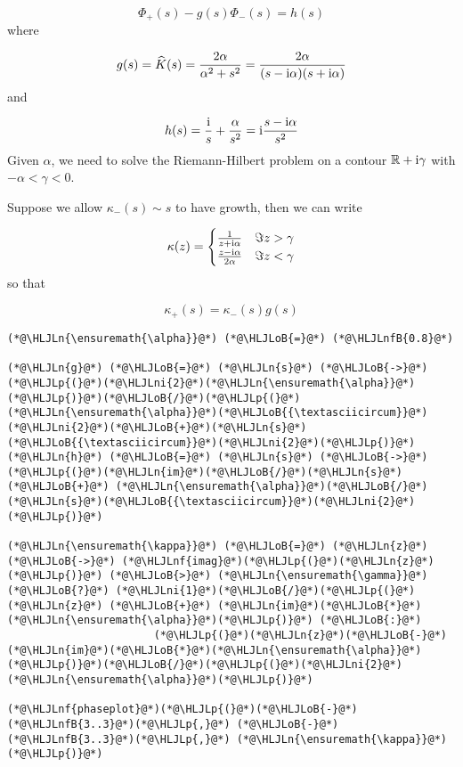 \documentclass[12pt,landscape]{article}
\newcommand{\HLJLn}[1]{#1}
\newcommand{\HLJLnf}[1]{\textcolor[RGB]{66,102,213}{#1}}
\newcommand{\HLJLnfB}[1]{\textcolor[RGB]{59,151,46}{#1}}
\newcommand{\HLJLni}[1]{\textcolor[RGB]{59,151,46}{#1}}
\newcommand{\HLJLoB}[1]{\textcolor[RGB]{102,102,102}{\textbf{#1}}}
\newcommand{\HLJLp}[1]{#1}
\def\I{ {\rm i} }
\begin{document}
{\[
\Phi_+(s) - g(s) \Phi_-(s) = h(s)
\]
where

\[
g(s) = \widehat K(s) = {2\alpha \over \alpha^2 +s^2}= {2 \alpha \over (s-\I \alpha)(s+\I \alpha)}
\]
and

\[
h(s) = {\I \over s} + {\alpha \over s^2} = \I {s -\I \alpha \over s^2}
\]
Given $\alpha$, we need to solve the Riemann-Hilbert problem on a contour $\mathbb{R} + \I\gamma$ with $-\alpha < \gamma < 0$.

Suppose we allow $\kappa_-(s) \sim s$ to have growth, then we can write

\[
\kappa(z) = \begin{cases} {1 \over z+\I \alpha }& \Im z > \gamma \\
                        {z-\I \alpha \over 2 \alpha} & \Im z < \gamma
\end{cases}
\]
so that

\[
\kappa_+(s) = \kappa_-(s) g(s)
\]

\begin{lstlisting}
(*@\HLJLn{\ensuremath{\alpha}}@*) (*@\HLJLoB{=}@*) (*@\HLJLnfB{0.8}@*)

(*@\HLJLn{g}@*) (*@\HLJLoB{=}@*) (*@\HLJLn{s}@*) (*@\HLJLoB{->}@*) (*@\HLJLp{(}@*)(*@\HLJLni{2}@*)(*@\HLJLn{\ensuremath{\alpha}}@*)(*@\HLJLp{)}@*)(*@\HLJLoB{/}@*)(*@\HLJLp{(}@*)(*@\HLJLn{\ensuremath{\alpha}}@*)(*@\HLJLoB{{\textasciicircum}}@*)(*@\HLJLni{2}@*)(*@\HLJLoB{+}@*)(*@\HLJLn{s}@*)(*@\HLJLoB{{\textasciicircum}}@*)(*@\HLJLni{2}@*)(*@\HLJLp{)}@*)
(*@\HLJLn{h}@*) (*@\HLJLoB{=}@*) (*@\HLJLn{s}@*) (*@\HLJLoB{->}@*) (*@\HLJLp{(}@*)(*@\HLJLn{im}@*)(*@\HLJLoB{/}@*)(*@\HLJLn{s}@*) (*@\HLJLoB{+}@*) (*@\HLJLn{\ensuremath{\alpha}}@*)(*@\HLJLoB{/}@*)(*@\HLJLn{s}@*)(*@\HLJLoB{{\textasciicircum}}@*)(*@\HLJLni{2}@*)(*@\HLJLp{)}@*)

(*@\HLJLn{\ensuremath{\kappa}}@*) (*@\HLJLoB{=}@*) (*@\HLJLn{z}@*) (*@\HLJLoB{->}@*) (*@\HLJLnf{imag}@*)(*@\HLJLp{(}@*)(*@\HLJLn{z}@*)(*@\HLJLp{)}@*) (*@\HLJLoB{>}@*) (*@\HLJLn{\ensuremath{\gamma}}@*) (*@\HLJLoB{?}@*) (*@\HLJLni{1}@*)(*@\HLJLoB{/}@*)(*@\HLJLp{(}@*)(*@\HLJLn{z}@*) (*@\HLJLoB{+}@*) (*@\HLJLn{im}@*)(*@\HLJLoB{*}@*)(*@\HLJLn{\ensuremath{\alpha}}@*)(*@\HLJLp{)}@*) (*@\HLJLoB{:}@*)
                       (*@\HLJLp{(}@*)(*@\HLJLn{z}@*)(*@\HLJLoB{-}@*)(*@\HLJLn{im}@*)(*@\HLJLoB{*}@*)(*@\HLJLn{\ensuremath{\alpha}}@*)(*@\HLJLp{)}@*)(*@\HLJLoB{/}@*)(*@\HLJLp{(}@*)(*@\HLJLni{2}@*)(*@\HLJLn{\ensuremath{\alpha}}@*)(*@\HLJLp{)}@*)

(*@\HLJLnf{phaseplot}@*)(*@\HLJLp{(}@*)(*@\HLJLoB{-}@*)(*@\HLJLnfB{3..3}@*)(*@\HLJLp{,}@*) (*@\HLJLoB{-}@*)(*@\HLJLnfB{3..3}@*)(*@\HLJLp{,}@*) (*@\HLJLn{\ensuremath{\kappa}}@*)(*@\HLJLp{)}@*)
\end{lstlisting}

}
\end{document}
